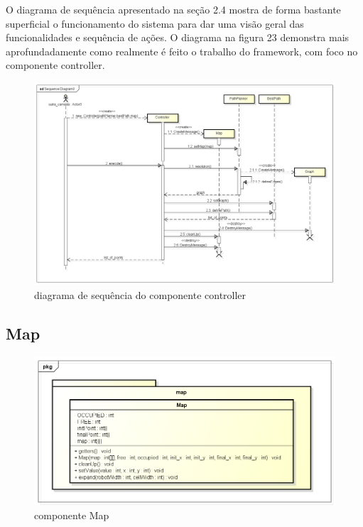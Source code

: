 O diagrama de sequência apresentado na seção 2.4 mostra de forma bastante superficial o funcionamento do sistema para dar uma visão geral das funcionalidades e sequência de ações. O diagrama na figura 23 demonstra mais aprofundadamente como realmente é feito o trabalho do framework, com foco no componente controller.

\begin{figure}[h]
	\centering
	\label{fig23}
		\includegraphics[keepaspectratio=true,scale=0.4]{figuras/executeController.png}
	\caption{diagrama de sequência do componente controller}
\end{figure}

\subsection{Map}

\begin{figure}[h]
	\centering
	\label{fig24}
		\includegraphics[keepaspectratio=true,scale=0.5]{figuras/pkgmap.png}
	\caption{componente Map}
\end{figure}


